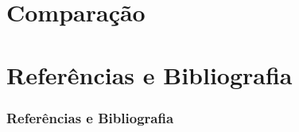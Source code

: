\documentclass[10pt]{beamer}
\theoremstyle{plain}
\begin{document}
\section{Comparação}


\section[Referências]{Referências e Bibliografia}
\begin{frame}[t,allowframebreaks]
  \frametitle{Referências e Bibliografia}
  \footnotesize
  \nocite{*}
  \printbibliography[]
\end{frame}
\end{document}
